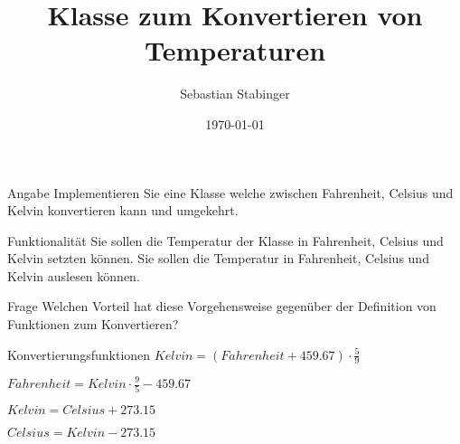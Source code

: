 \documentclass[presentation]{beamer}
\author{Sebastian Stabinger}
\date{\today}
\title{Klasse zum Konvertieren von Temperaturen}
\begin{document}
\maketitle

\begin{frame}[label={sec:org706ae3b}]{Angabe}
Implementieren Sie eine Klasse welche zwischen \alert{Fahrenheit}, \alert{Celsius}
und \alert{Kelvin} konvertieren kann und umgekehrt.
\begin{block}{Funktionalität}
Sie sollen die Temperatur der Klasse in Fahrenheit, Celsius und Kelvin
setzten können. Sie sollen die Temperatur in Fahrenheit, Celsius und
Kelvin auslesen können.
\end{block}
\begin{block}{Frage}
Welchen Vorteil hat diese Vorgehensweise gegenüber der Definition von
Funktionen zum Konvertieren?
\end{block}
\begin{block}{Konvertierungsfunktionen}
\(Kelvin = (Fahrenheit + 459.67)\cdot\frac{5}{9}\)

\(Fahrenheit = Kelvin \cdot\frac{9}{5} - 459.67\)

\(Kelvin = Celsius + 273.15\)

\(Celsius = Kelvin - 273.15\)
\end{block}
\end{frame}
\end{document}
